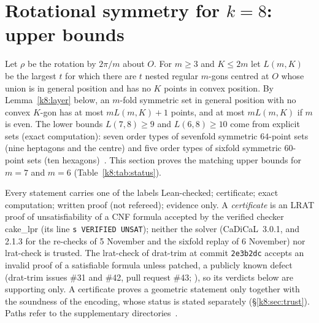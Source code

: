 
\section{Rotational symmetry for \texorpdfstring{$k=8$}{k=8}: upper bounds}\label{sec:k8}

Let $\rho$ be the rotation by $2\pi/m$ about $O$. For $m\ge3$ and $K\le 2m$ let $L(m,K)$ be the largest $t$ for which
there are $t$ nested regular $m$-gons centred at $O$ whose union is in general position and has no $K$ points in convex
position. By Lemma~\ref{k8:layer} below, an $m$-fold symmetric set in general position with no convex $K$-gon has at most
$mL(m,K)+1$ points, and at most $mL(m,K)$ if $m$ is even. The lower bounds $L(7,8)\ge9$ and $L(6,8)\ge10$ come from
explicit sets (exact computation): seven order types of sevenfold symmetric $64$-point sets (nine heptagons and the
centre) and five order types of sixfold symmetric $60$-point sets (ten
hexagons)~\cite[, , ]{Supp}. This section proves the matching upper bounds for
$m=7$ and $m=6$ (Table~\ref{k8:tab:status}).

Every statement carries one of the labels Lean-checked; certificate; exact computation; written proof
(not refereed); evidence only. A \emph{certificate} is an LRAT proof of unsatisfiability of a CNF formula accepted by
the verified checker cake\_lpr (its line \texttt{s VERIFIED UNSAT}); neither the solver (CaDiCaL~3.0.1, and 2.1.3 for
the re-checks of 5 November and the sixfold replay of 6 November) nor lrat-check is trusted. The lrat-check of drat-trim at commit \texttt{2e3b2dc} accepts an invalid proof of a satisfiable formula
unless patched, a publicly known defect (drat-trim issues \#31 and \#42, pull request \#43; ), so
its verdicts below are supporting only. A certificate proves a
geometric statement only together with the soundness of the encoding, whose status is stated separately
(\S\ref{k8:sec:trust}). Paths refer to the supplementary directories~\cite{Supp}.

